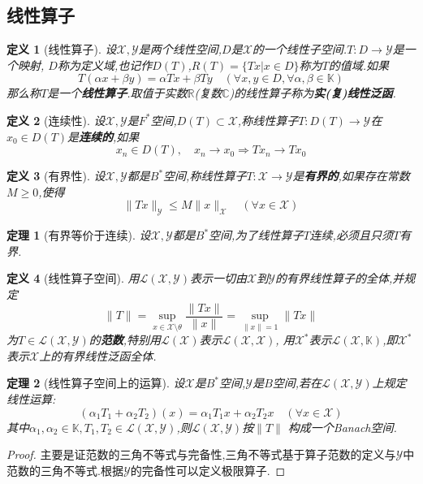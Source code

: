 \documentclass[12pt,a4paper]{article}
\newtheorem{thm}{定理}[subsection]  %
\newtheorem{definition}{定义}[subsection] %
\begin{document}
\subsection{线性算子}
\begin{definition}[线性算子]
    设$\mathscr{X},\mathscr{Y}$是两个线性空间,$D$是$\mathscr{X}$的一个线性子空间.$T:D\to \mathscr{Y}$是一个映射,
    $D$称为定义域,也记作$D(T)$,$R(T)=\{Tx|x \in D\}$称为$T$的值域.如果
    \[T(\alpha x + \beta y) = \alpha Tx + \beta Ty\quad (\forall x,y \in D,\forall \alpha,\beta \in \mathbb{K})\]
    那么称$T$是一个\textbf{线性算子}.取值于实数$\mathbb{R}$(复数$\mathbb{C}$)的线性算子称为\textbf{实(复)线性泛函}.
\end{definition}
\begin{definition}[连续性]
    设$\mathscr{X},\mathscr{Y}$是$F^*$空间,$D(T)\subset \mathscr{X}$,称线性算子$T:D(T)\to \mathscr{Y}$在$x_0 \in D(T)$是\textbf{连续的},如果
    \[x_n \in D(T),\quad x_n \to x_0\Rightarrow Tx_n\to Tx_0\]
\end{definition}
\begin{definition}[有界性]
    设$\mathscr{X},\mathscr{Y}$都是$B^*$空间,称线性算子$T:\mathscr{X}\to \mathscr{Y}$是\textbf{有界的},如果存在常数$M\geq 0$,使得
    \[\|Tx\|_{\mathscr{Y}}\leq M\|x\|_{\mathscr{X}} \quad (\forall x \in \mathscr{X})\]
\end{definition}
\begin{thm}[有界等价于连续]
    设$\mathscr{X},\mathscr{Y}$都是$B^*$空间,为了线性算子$T$连续,必须且只须$T$有界.
\end{thm}
\begin{definition}[线性算子空间]
    用$\mathscr{L}(\mathscr{X},\mathscr{Y})$表示一切由$\mathscr{X}$到$\mathscr{Y}$的有界线性算子的全体,并规定
    \[\|T\| = \underset{x\in \mathscr{X}\setminus \theta}{\sup} \frac{\|Tx\|}{\|x\|} = \underset{\|x\|=1}{\sup}\|Tx\| \]
    为$T\in \mathscr{L}(\mathscr{X},\mathscr{Y})$的\textbf{范数},特别用$\mathscr{L}(\mathscr{X})$表示$\mathscr{L}(\mathscr{X},\mathscr{X})$,
    用$\mathscr{X}^*$表示$\mathscr{L}(\mathscr{X},\mathbb{K})$,即$\mathscr{X}^*$表示$\mathscr{X}$上的有界线性泛函全体.
\end{definition}
\begin{thm}[线性算子空间上的运算]
    设$\mathscr{X}$是$B^*$空间,$\mathscr{Y}$是$B$空间,若在$\mathscr{L}(\mathscr{X},\mathscr{Y})$上规定线性运算:
    \[(\alpha_1 T_1 + \alpha_2 T_2)(x) = \alpha_1 T_1 x + \alpha_2 T_2 x \quad (\forall x \in \mathscr{X}) \]
    其中$\alpha_1,\alpha_2\in \mathbb{K},T_1,T_2\in\mathscr{L}(\mathscr{X},\mathscr{Y})$,则$\mathscr{L}(\mathscr{X},\mathscr{Y})$按$\|T\|$
    构成一个\rm{Banach}空间.
\end{thm}
\begin{proof}
    主要是证范数的三角不等式与完备性,三角不等式基于算子范数的定义与$\mathscr{Y}$中范数的三角不等式.根据$\mathscr{Y}$的完备性可以定义极限算子.
\end{proof}
\end{document}
